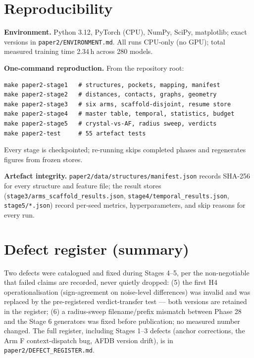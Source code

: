 \documentclass[11pt]{article}
\begin{document}
\appendix
\section{Reproducibility}

\textbf{Environment.} Python 3.12, PyTorch (CPU), NumPy, SciPy,
matplotlib; exact versions in \texttt{paper2/ENVIRONMENT.md}. All runs
CPU-only (no GPU); total measured training time 2.34\,h across 280
models.

\textbf{One-command reproduction.} From the repository root:
\begin{verbatim}
make paper2-stage1   # structures, pockets, mapping, manifest
make paper2-stage2   # distances, contacts, graphs, geometry
make paper2-stage3   # six arms, scaffold-disjoint, resume store
make paper2-stage4   # master table, temporal, statistics, budget
make paper2-stage5   # crystal-vs-AF, radius sweep, verdicts
make paper2-test     # 55 artefact tests
\end{verbatim}
Every stage is checkpointed; re-running skips completed phases and
regenerates figures from frozen stores.

\textbf{Artefact integrity.} \texttt{paper2/data/structures/manifest.json}
records SHA-256 for every structure and feature file; the result stores
(\texttt{stage3/arms\_scaffold\_results.json},
\texttt{stage4/temporal\_results.json}, \texttt{stage5/*.json}) record
per-seed metrics, hyperparameters, and skip reasons for every run.

\section{Defect register (summary)}

Two defects were catalogued and fixed during Stages 4--5, per the
non-negotiable that failed claims are recorded, never quietly dropped:
(5) the first H4 operationalisation (sign-agreement on noise-level
differences) was invalid and was replaced by the pre-registered
verdict-transfer test --- both versions are retained in the register;
(6) a radius-sweep filename/prefix mismatch between Phase 28 and the
Stage 6 generators was fixed before publication; no measured number
changed. The full register, including Stages 1--3 defects (anchor
corrections, the Arm F context-dispatch bug, AFDB version drift), is in
\texttt{paper2/DEFECT\_REGISTER.md}.
\end{document}
